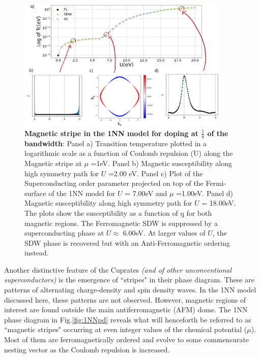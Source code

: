 \documentclass[12pt]{article}
\begin{document}
\begin{figure}[htbp]  %
    \centering
    \includegraphics[width=0.9\textwidth]{1NNstripes.png}  %
    \caption{\textbf{Magnetic stripe in the 1NN model for doping at $\frac{1}{8}$ of the bandwidth}: Panel a) Transition temperature plotted in a logarithmic scale as a function of Coulomb repulsion (U) along the Magnetic stripe at $\mu$ =1eV. 
       Panel b) Magnetic susceptibility along high symmetry path for $U$ =2.00 eV. 
       Panel c) Plot of the Superconducting order parameter projected on top of the Fermi-surface of the 1NN model for $U$ = 7.00eV and $\mu$ =1.00eV.
       Panel d) Magnetic susceptibility along high symmetry path for $U$ = 18.00eV. The plots show the susceptibility as a function of \b{q} for both magnetic regions. The Ferromagnetic SDW is suppressed by a superconducting phase at $U$$\approx$ 6.00eV. At larger values of $U$,  the SDW phase is recovered but with an Anti-Ferromagnetic ordering instead.  }
    \label{fig:1NN_stripes}
\end{figure}


\noindent Another distinctive feature of the Cuprates \textit{(and of other unconventional superconductors}\cite{levi1998stripes}\textit{)} is 
the emergence of ``stripes" in their phase diagram. These are patterns of alternating
charge-density and spin density waves\cite{zachar1998landau, vojta2009lattice}. 
In the 1NN model discussed here, these patterns are not observed. However, magnetic regions of 
interest are found outside the main antiferromagnetic (AFM) dome. 
The 1NN phase diagram in Fig.\ref{fig:1NNpd} reveals what will henceforth be referred to as ``magnetic stripes" 
occurring at even integer values of the chemical potential ($\mu$). Most of them are ferromagnetically ordered and evolve to some commensurate 
nesting vector as the Coulomb repulsion is increased. \par
\medskip
\end{document}
